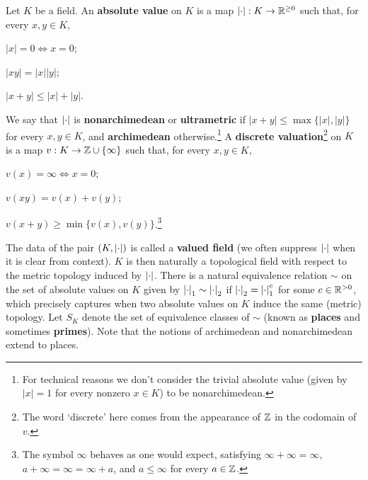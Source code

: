 \documentclass[11pt]{article}
\begin{document}
\begin{definition}
Let $K$ be a field. An \textbf{absolute value} on $K$ is a map $\left\lvert\cdot\right\rvert: K\to\mathbb{R}^{\geq0}$ such that, for every $x,y\in K$,
\begin{enum}{\roman}
\item $|x|=0\iff x=0$;
\item $|xy|=|x||y|$;
\item $|x+y|\leq|x|+|y|$.
\end{enum}
We say that $\left\lvert\cdot\right\rvert$ is \textbf{nonarchimedean} or \textbf{ultrametric} if $|x+y|\leq\max\{|x|,|y|\}$ for every $x,y\in K$, and \textbf{archimedean} otherwise.\footnote{For technical reasons we don't consider the trivial absolute value (given by $|x|=1$ for every nonzero $x\in K$) to be nonarchimedean.} A \textbf{discrete valuation}\footnote{The word `discrete' here comes from the appearance of $\mathbb{Z}$ in the codomain of $v$.} on $K$ is a map $v: K\to\mathbb{Z}\cup\{\infty\}$ such that, for every $x,y\in K$,
\begin{enum}{\roman}
\item $v(x)=\infty\iff x=0$;
\item $v(xy)=v(x)+v(y)$;
\item $v(x+y)\geq\min\{v(x),v(y)\}$.\footnote{The symbol $\infty$ behaves as one would expect, satisfying $\infty+\infty=\infty$, $a+\infty=\infty=\infty+a$, and $a\leq\infty$ for every $a\in\mathbb{Z}$.}
\end{enum} 
The data of the pair $(K,\left\lvert\cdot\right\rvert)$ is called a \textbf{valued field} (we often suppress $\left\lvert\cdot\right\rvert$ when it is clear from context). $K$ is then naturally a topological field with respect to the metric topology induced by $\left\lvert\cdot\right\rvert$. There is a natural equivalence relation $\sim$ on the set of absolute values on $K$ given by $\left\lvert\cdot\right\rvert_1\sim\left\lvert\cdot\right\rvert_2$ if $\left\lvert\cdot\right\rvert_2=\left\lvert\cdot\right\rvert_1^c$ for some $c\in\mathbb{R}^{>0}$, which precisely captures when two absolute values on $K$ induce the same (metric) topology. Let $S_K$ denote the set of equivalence classes of $\sim$ (known as \textbf{places} and sometimes \textbf{primes}). Note that the notions of archimedean and nonarchimedean extend to places.
\end{definition}
\end{document}
